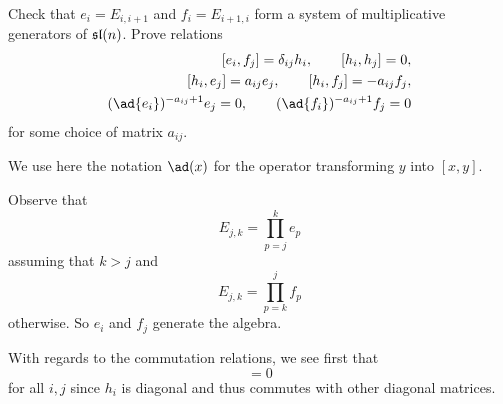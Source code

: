 \begin{exercise}
Check that $e_{i} = E_{i,i+1}$ and $f_{i} = E_{i+1,i}$ form a system of multiplicative generators of
$\frak{sl}(n)$. Prove relations
\begin{subequations}
\begin{align}
  [e_{i} , f_{j} ] = \delta_{ij} h_{i},\qquad [h_{i} , h_{j} ] = 0,\\
  [h_{i} , e_{j} ] = a_{ij} e_{j} ,\qquad [h_{i} , f_{j} ] = -a_{ij} f_{j},\\
  (\ad{e_{i}} )^{-a_{ij} +1} e_{j} = 0,\qquad (\ad{f_{i}} )^{-a_{ij} +1} f_{j} = 0
\end{align}
\end{subequations}
for some choice of matrix $a_{ij}$.

 We use here the notation $\ad(x)$ for the operator transforming $y$ into $[x, y]$.
\end{exercise}

\answer{} Observe that
\begin{equation}
E_{j,k} = \prod^{k}_{p=j} e_{p}
\end{equation}
assuming that $k>j$ and
\begin{equation}
E_{j,k} = \prod^{j}_{p=k}f_{p}
\end{equation}
otherwise. So $e_{i}$ and $f_{j}$ generate the algebra.

With regards to the commutation relations, we see first that 
\begin{equation}
[h_{i},h_{j}]=0
\end{equation}
for all $i,j$ since $h_{i}$ is diagonal and thus commutes with
other diagonal matrices. 


